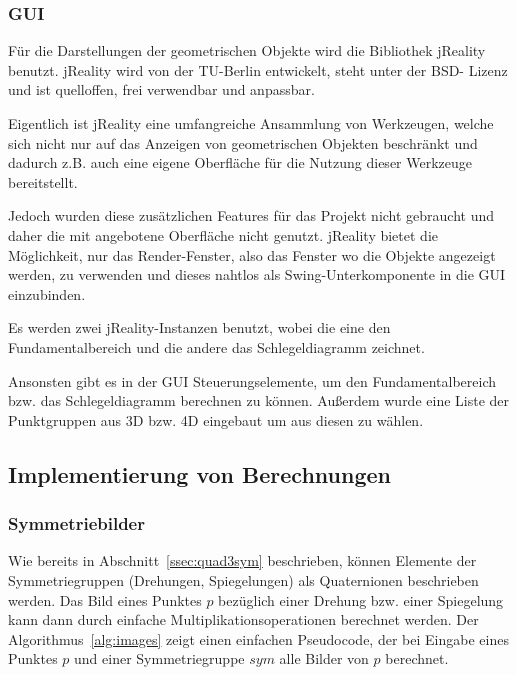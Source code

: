         \subsubsection{GUI\label{ssec:gui}}

            Für die Darstellungen der geometrischen Objekte wird die Bibliothek
            jReality~\cite{jreality} benutzt.
            jReality wird von der TU-Berlin entwickelt, steht unter der BSD-
            Lizenz und ist quelloffen, frei verwendbar und anpassbar.

            Eigentlich ist jReality eine umfangreiche Ansammlung von Werkzeugen,
            welche sich nicht nur auf das Anzeigen von geometrischen Objekten
            beschränkt und dadurch z.B. auch eine eigene Oberfläche für die Nutzung
            dieser Werkzeuge bereitstellt.

            \noindent Jedoch wurden diese zusätzlichen Features für das Projekt nicht
            gebraucht und daher die mit angebotene Oberfläche nicht genutzt. jReality
            bietet die Möglichkeit, nur das Render-Fenster, also das Fenster wo
            die Objekte angezeigt werden, zu verwenden und dieses 
            nahtlos als Swing-Unterkomponente in die GUI einzubinden.


            Es werden zwei jReality-Instanzen benutzt, wobei die eine den
            Fundamentalbereich und die andere das Schlegeldiagramm zeichnet.

            \noindent Ansonsten gibt es in der GUI Steuerungselemente, um den
            Fundamentalbereich bzw. das Schlegeldiagramm berechnen zu können.
            Außerdem wurde eine Liste der Punktgruppen aus 3D bzw. 4D eingebaut um
            aus diesen zu wählen.

\subsection{Implementierung von Berechnungen}
    \subsubsection{Symmetriebilder}
        Wie bereits in Abschnitt~\ref{ssec:quad3sym} beschrieben, können Elemente der Symmetriegruppen (Drehungen, Spiegelungen) als Quaternionen beschrieben werden.
        Das Bild eines Punktes $p$ bezüglich einer Drehung bzw. einer Spiegelung kann dann durch einfache Multiplikationsoperationen berechnet werden.
        Der Algorithmus~\ref{alg:images} zeigt einen einfachen Pseudocode, der bei Eingabe eines Punktes $p$ und einer Symmetriegruppe $sym$ alle Bilder von $p$ berechnet.

